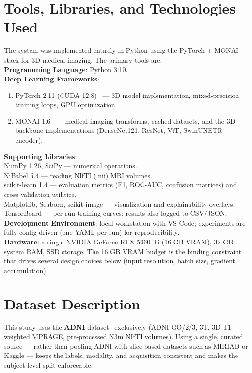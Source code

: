 \section{Tools, Libraries, and Technologies Used}
The system was implemented entirely in Python using the PyTorch + MONAI stack for 3D medical imaging. The primary tools are:\\
\textbf{Programming Language}: Python 3.10.\\
\textbf{Deep Learning Frameworks}:
\begin{enumerate}
    \item PyTorch 2.11 (CUDA 12.8)~\cite{paszke2019pytorch} --- 3D model implementation, mixed-precision training loops, GPU optimization.
    \item MONAI 1.6~\cite{cardoso2022monai} --- medical-imaging transforms, cached datasets, and the 3D backbone implementations (DenseNet121, ResNet, ViT, SwinUNETR encoder).
\end{enumerate}
\textbf{Supporting Libraries}:\\
NumPy 1.26, SciPy --- numerical operations.\\
NiBabel 5.4 --- reading NIfTI (.nii) MRI volumes.\\
scikit-learn 1.4 --- evaluation metrics (F1, ROC-AUC, confusion matrices) and cross-validation utilities.\\
Matplotlib, Seaborn, scikit-image --- visualization and explainability overlays.\\
TensorBoard --- per-run training curves; results also logged to CSV/JSON.\\
\textbf{Development Environment}: local workstation with VS Code; experiments are fully config-driven (one YAML per run) for reproducibility.\\
\textbf{Hardware}: a single NVIDIA GeForce RTX 5060 Ti (16 GB VRAM), 32 GB system RAM, SSD storage. The 16 GB VRAM budget is the binding constraint that drives several design choices below (input resolution, batch size, gradient accumulation).

\section{Dataset Description}
This study uses the \textbf{ADNI} dataset~\cite{jack2008adni,petersen2010adni} exclusively (ADNI GO/2/3, 3T, 3D T1-weighted MPRAGE, pre-processed N3m NIfTI volumes). Using a single, curated source --- rather than pooling ADNI with slice-based datasets such as MIRIAD or Kaggle --- keeps the labels, modality, and acquisition consistent and makes the subject-level split enforceable.

